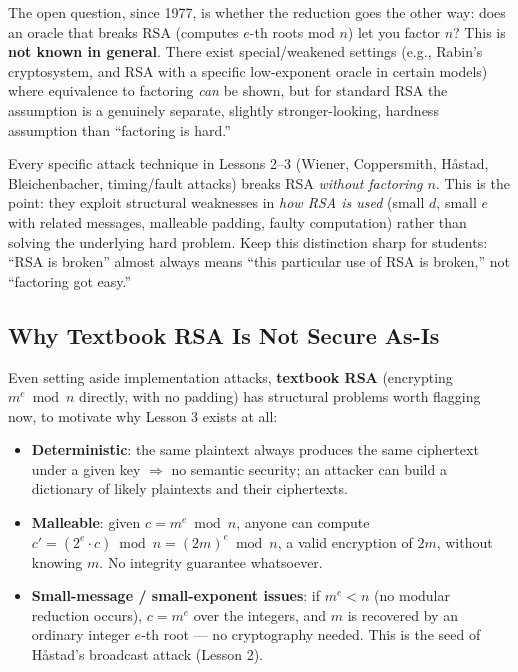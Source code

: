 The open question, since 1977, is whether the reduction goes the other way: does an oracle that breaks RSA (computes $e$-th roots mod $n$) let you factor $n$? This is \textbf{not known in general}. There exist special/weakened settings (e.g., Rabin's cryptosystem, and RSA with a specific low-exponent oracle in certain models) where equivalence to factoring \emph{can} be shown, but for standard RSA the assumption is a genuinely separate, slightly stronger-looking, hardness assumption than ``factoring is hard.''

\begin{remark}
Every specific attack technique in Lessons 2--3 (Wiener, Coppersmith, Håstad, Bleichenbacher, timing/fault attacks) breaks RSA \emph{without factoring $n$}. This is the point: they exploit structural weaknesses in \emph{how RSA is used} (small $d$, small $e$ with related messages, malleable padding, faulty computation) rather than solving the underlying hard problem. Keep this distinction sharp for students: ``RSA is broken'' almost always means ``this particular use of RSA is broken,'' not ``factoring got easy.''
\end{remark}

\subsection{Why Textbook RSA Is Not Secure As-Is}

Even setting aside implementation attacks, \textbf{textbook RSA} (encrypting $m^e \bmod n$ directly, with no padding) has structural problems worth flagging now, to motivate why Lesson 3 exists at all:

\begin{itemize}
\item \textbf{Deterministic}: the same plaintext always produces the same ciphertext under a given key $\Rightarrow$ no semantic security; an attacker can build a dictionary of likely plaintexts and their ciphertexts.
\item \textbf{Malleable}: given $c = m^e \bmod n$, anyone can compute $c' = (2^e \cdot c) \bmod n = (2m)^e \bmod n$, a valid encryption of $2m$, without knowing $m$. No integrity guarantee whatsoever.
\item \textbf{Small-message / small-exponent issues}: if $m^e < n$ (no modular reduction occurs), $c = m^e$ over the integers, and $m$ is recovered by an ordinary integer $e$-th root — no cryptography needed. This is the seed of Håstad's broadcast attack (Lesson 2).
\end{itemize}

